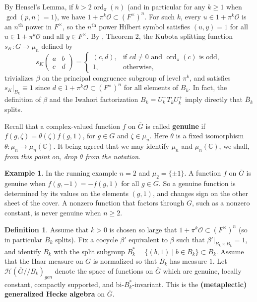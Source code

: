 \documentclass[12pt,letterpaper,reqno]{amsart}
\let\cal\mathcal
\let\Bbb\mathbb
\theoremstyle{definition}
\newtheorem{definition}[theorem]{Definition}
\newtheorem{example}[theorem]{Example}
\theoremstyle{remark}
\numberwithin{equation}{section}
\begin{document}
By Hensel's Lemma, if $k>2\operatorname{ord}_\pi(n)$ (and in particular for
any $k\ge 1$ when $\gcd(p,n)=1$), we have
$1+\pi^k{\cal O}\subset (F^\times)^n$. For such $k$, every $u\in 1+\pi^k{\cal O}$
is an $n^{\text{th}}$ power in $F^\times$, so the $n^{\text{th}}$ power
Hilbert symbol satisfies $(u,y)=1$ for all $u\in 1+\pi^k{\cal O}$ and all
$y\in F^\times$. By \cite{Ku67}, Theorem 2, the Kubota splitting function
$s_K:G\rightarrow \mu_n$ defined by
\[
s_K\begin{pmatrix} a & b \\ c & d \end{pmatrix}
=
\begin{cases}
(c,d), & \text{if } cd\neq 0 \text{ and } \operatorname{ord}_\pi(c) \text{ is odd},\\
1, & \text{otherwise},
\end{cases}
\]
trivializes $\beta$ on the principal congruence subgroup of level $\pi^k$, and
satisfies $s_K|_{B_k}\equiv 1$ since $d\in 1+\pi^k{\cal O}\subset (F^\times)^n$
for all elements of $B_k$. In fact, the definition of $\beta$ and the Iwahori
factorization $B_k=U_k^- T_k U_k^+$ imply directly that $\overline{B}_k$
splits.

Recall that a complex-valued function $f$ on $\overline{G}$ is called
\textbf{genuine} if $f(g,\zeta)=\theta(\zeta) f(g,1)$, for $g\in G$ and
$\zeta\in \mu_n$. Here $\theta$ is a fixed isomorphism
$\theta:\mu_n\rightarrow \mu_n({\Bbb{C}})$. It being agreed that we may
identify $\mu_n$ and $\mu_n({\Bbb{C}})$, we shall, \emph{from this point on,
drop $\theta$ from the notation.}

\begin{example}
\label{ex:genuine}
In the running example $n=2$ and $\mu_2=\{\pm 1\}$. A function $f$ on
$\overline{G}$ is genuine when $f(g,-1)=-f(g,1)$ for all $g\in G$. So a genuine
function is determined by its values on the elements $(g,1)$, and changes sign
on the other sheet of the cover. A nonzero function that factors through $G$,
such as a nonzero constant, is never genuine when $n\ge 2$.
\end{example}

\begin{definition}
\label{def:2}
Assume that $k>0$ is chosen so large that $1+\pi^k{\cal O}\subset (F^\times)^n$
(so in particular $\overline{B}_k$ splits). Fix a cocycle $\beta'$ equivalent
to $\beta$ such that $\beta'|_{B_k\times B_k}=1$, and identify $B_k$ with the
split subgroup $B_k^*=\{(b,1)\mid b\in B_k\}\subset \overline{B}_k$. Assume
that the Haar measure on $\overline{G}$ is normalized so that $\overline{B}_k$
has measure $1$. Let ${\cal H}(\overline{G}//B_k)_{gen}$ denote the space of
functions on $\overline{G}$ which are genuine, locally constant, compactly
supported, and bi-$B_k^*$-invariant. This is the \textbf{(metaplectic)
generalized Hecke algebra} on $\overline{G}$.
\end{definition}
\end{document}
